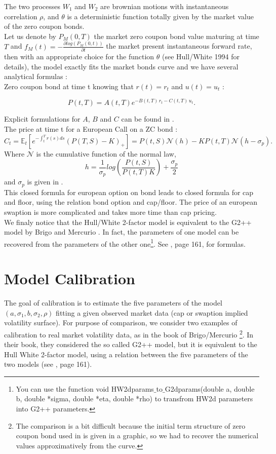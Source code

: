 \documentclass[12pt,a4paper]{article}
\def \d{\partial}
\def\E{{\mathbb E}}
\def \cN{\mathcal{N}}
\begin{document}
The two processes $W_1$ and $W_2$ are brownian motions with instantaneous correlation $\rho$, and $\theta$ is a deterministic function totally given by the market value of the zero coupon bonds.\\

Let us denote by $P_M(0,T)$ the market zero coupon bond value maturing at time
$T$ and $f_M(t)=-\frac{\d log(P_M(0,t))}{\d t}$ the market present
instantaneous forward rate, then with an appropriate choice for the function $\theta$ (see Hull/White 1994 for details), the model exactly fits the market bonds curve and we have several analytical formulas :\\

\noindent Zero coupon bond at time t knowing that $r(t) = r_t$ and $u(t) = u_t$ :

$$P(t,T)  =  A(t,T)e^{-B(t,T)\,r_t-C(t,T)\,u_t}.$$

\noindent Explicit formulations for $A$, $B$ and $C$ can be found in \cite{HW2d}.\\

\noindent The price at time t for a European Call on a ZC bond : 
$$C_t = \E_t \left[ e^{-\int_t^T r(s)ds}(P(T,S)-K)_+ \right] =
P(t,S)\cN(h) -KP(t,T)\cN(h-\sigma_p).$$
Where $\cN$ is the cumulative function of the normal law,
$$h=\frac{1}{\sigma_p}log\left(\frac{P(t,S)}{P(t,T)K}\right)+\frac{\sigma_p}{2}$$ and
$\sigma_p$ is given in \cite{HW2d}.\\

This closed formula for european option on bond leads to closed formula for cap and floor, using the relation bond option and cap/floor. The price of an european swaption is more complicated and takes more time than cap pricing.\\

We finaly notice that the Hull/White 2-factor model is equivalent to the G2++ model by Brigo and Mercurio \cite{BM}. In fact, the parameters of one model can be recovered from the parameters of the other one\footnote{You can use the function void HW2dparams$\_$to$\_$G2dparams(double a, double b, double *sigma, double *eta, double *rho) to transfrom HW2d parameters into G2++ parameters.}. See \cite{BM}, page 161, for formulas.

\section{Model Calibration}

The goal of calibration is to estimate the five parameters of the model $(a, \sigma_1, b, \sigma_2, \rho)$ fitting a given observed market data (cap or swaption implied volatility surface). For purpose of comparison, we consider two examples of calibration to real market volatility data, as in the book of Brigo/Mercurio \cite{BM}\footnote{The comparison is a bit difficult because the initial term structure of zero coupon bond used in \cite{BM} is given in a graphic, so we had to recover the numerical values approximatively from the curve.}. In their book, they considered the so called G2++ model, but it is equivalent to the Hull White 2-factor model, using a relation between the five parameters of the two models (see \cite{BM}, page 161).
\end{document}
